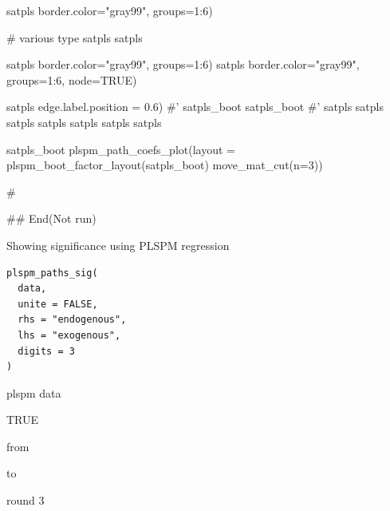 \documentclass[a4paper]{book}
\begin{document}
\begin{Examples}
\begin{ExampleCode}
satpls %
                            border.color="gray99", groups=1:6)


# various type
satpls %
satpls %

satpls %
                                 border.color="gray99", groups=1:6)
satpls %
                                 border.color="gray99", groups=1:6, node=TRUE)

satpls %
                                 edge.label.position = 0.6)
#'
satpls_boot%
satpls_boot%
#'
satpls %
satpls %
satpls %
satpls %
satpls %
satpls %
satpls %

satpls_boot %
plspm_path_coefs_plot(layout =  plspm_boot_factor_layout(satpls_boot)%
 move_mat_cut(n=3))

#



## End(Not run)
\end{ExampleCode}
\end{Examples}
%
\begin{Description}
Showing significance using PLSPM regression
\end{Description}
%
\begin{Usage}
\begin{verbatim}
plspm_paths_sig(
  data,
  unite = FALSE,
  rhs = "endogenous",
  lhs = "exogenous",
  digits = 3
)
\end{verbatim}
\end{Usage}
%
\begin{Arguments}
\begin{ldescription}
\item[\code{data}] plspm data

\item[\code{unite}] TRUE

\item[\code{rhs}] from

\item[\code{lhs}] to

\item[\code{digits}] round 3
\end{ldescription}
\end{Arguments}
\end{document}

